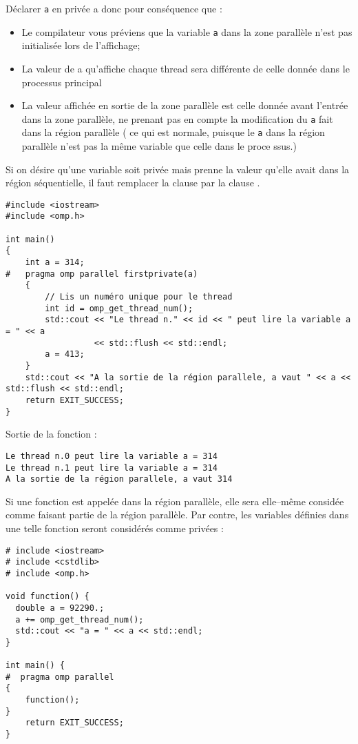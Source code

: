 \documentclass[fleqn,11pt]{article}
\begin{document}
Déclarer \texttt{a} en privée a donc pour conséquence que :
\begin{itemize}
  \item Le compilateur vous préviens que la variable \texttt{a} dans la zone parallèle n'est pas initialisée
  lors de l'affichage;
  \item La valeur de a qu'affiche chaque thread sera différente de celle donnée dans le processus principal
  \item La valeur affichée en sortie de la zone parallèle est celle donnée avant l'entrée dans la zone parallèle, ne prenant pas en compte la modification du \texttt{a} fait dans la région parallèle ( ce qui est normale, puisque le \texttt{a} dans la région parallèle n'est pas la même variable que celle dans le proce
  ssus.)
\end{itemize}


Si on désire qu'une variable soit privée mais prenne la valeur qu'elle avait dans la région séquentielle, il faut remplacer la clause \lstinline@private@ par la clause \lstinline@firstprivate@.

\begin{lstlisting}
#include <iostream>
#include <omp.h>

int main()
{
    int a = 314;
#   pragma omp parallel firstprivate(a)
    {
        // Lis un numéro unique pour le thread
        int id = omp_get_thread_num();
        std::cout << "Le thread n." << id << " peut lire la variable a = " << a 
                  << std::flush << std::endl;
        a = 413;
    }
    std::cout << "A la sortie de la région parallele, a vaut " << a << std::flush << std::endl;
    return EXIT_SUCCESS;
}
\end{lstlisting}

Sortie de la fonction :
\begin{verbatim}
Le thread n.0 peut lire la variable a = 314
Le thread n.1 peut lire la variable a = 314
A la sortie de la région parallele, a vaut 314
\end{verbatim}

Si une fonction est appelée dans la région parallèle, elle sera elle--même considée comme faisant partie de la
région parallèle. Par contre, les variables définies dans une telle fonction seront considérés comme privées :

\begin{lstlisting}
# include <iostream>
# include <cstdlib>
# include <omp.h>

void function() {
  double a = 92290.;
  a += omp_get_thread_num();
  std::cout << "a = " << a << std::endl;
}

int main() {
#  pragma omp parallel
{
    function();
}
    return EXIT_SUCCESS;
}
\end{lstlisting}
\end{document}

